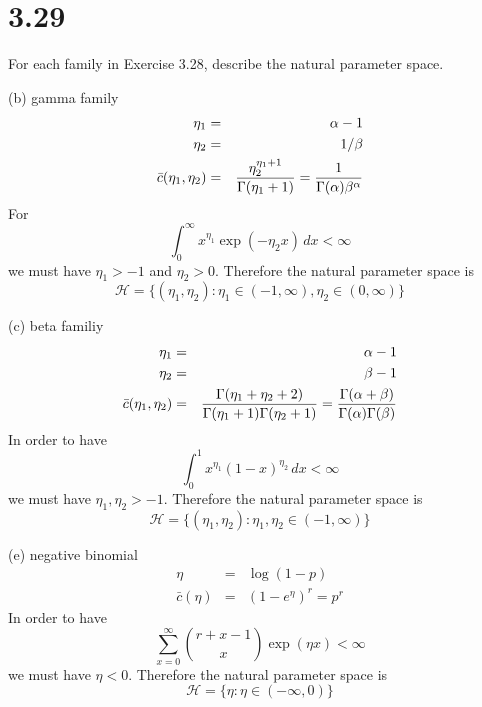 \section*{3.29}
For each family in Exercise 3.28, describe the natural parameter
space.

\bigskip
\noindent
(b) gamma family
\begin{eqnarray*}
\eta_1&=&\alpha-1\\
\eta_2&=&1/\beta\\
\bar c(\eta_1,\eta_2)&=&{\eta_2^{\eta_1+1}\over\Gamma(\eta_1+1)}
={1\over\Gamma(\alpha)\beta^\alpha}
\end{eqnarray*}
For
$$\int_0^\infty x^{\eta_1}\exp(-\eta_2x)\,dx<\infty$$
we must have $\eta_1>-1$ and $\eta_2>0$.
Therefore the natural parameter space is
$${\mathscr H}=\{(\eta_1,\eta_2):\eta_1\in(-1,\infty),\eta_2\in(0,\infty)\}$$

\bigskip
\noindent
(c) beta familiy
\begin{eqnarray*}
\eta_1&=&\alpha-1\\
\eta_2&=&\beta-1\\
\bar c(\eta_1,\eta_2)&=&
{\Gamma(\eta_1+\eta_2+2)\over\Gamma(\eta_1+1)\Gamma(\eta_2+1)}
={\Gamma(\alpha+\beta)\over\Gamma(\alpha)\Gamma(\beta)}
\end{eqnarray*}
In order to have
$$\int_0^1 x^{\eta_1}(1-x)^{\eta_2}\,dx<\infty$$
we must have $\eta_1,\eta_2>-1$.
Therefore the natural parameter space is
$$\mathscr H=\{(\eta_1,\eta_2):\eta_1,\eta_2\in(-1,\infty)\}$$

\bigskip
\noindent
(e) negative binomial
\begin{eqnarray*}
\eta&=&\log(1-p)\\
\bar c(\eta)&=&(1-e^\eta)^r=p^r
\end{eqnarray*}
In order to have
$$\sum_{x=0}^\infty {r+x-1\choose x}\exp(\eta x)<\infty$$
we must have $\eta<0$.
Therefore the natural parameter space is
$$\mathscr H=\{\eta:\eta\in(-\infty,0)\}$$

